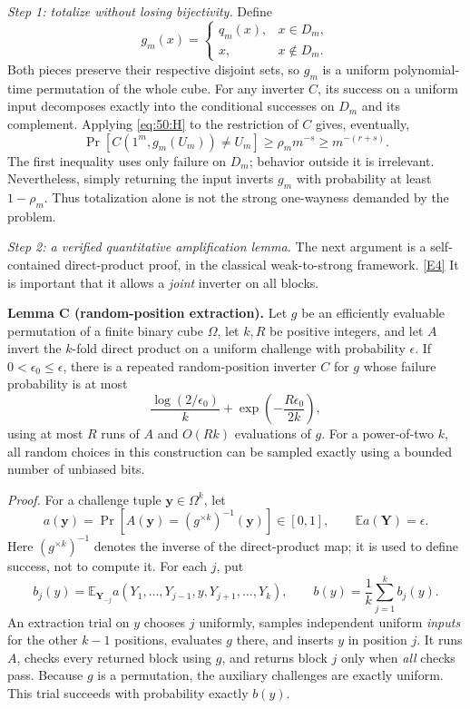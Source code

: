 \documentclass[11pt,a4paper]{article}
\newcommand{\E}{\mathbb{E}}
\newcommand{\eref}[2]{\hyperlink{extra:#1:#2}{[E#2]}}
\numberwithin{equation}{section}
\begin{document}
\textit{Step 1: totalize without losing bijectivity.}
Define
\begin{equation}\label{eq:50:guard}
 g_m(x)=\begin{cases}q_m(x),&x\in D_m,\\x,&x\notin D_m.\end{cases}
\end{equation}
Both pieces preserve their respective disjoint sets, so $g_m$ is a
uniform polynomial-time permutation of the whole cube. For any
inverter $C$, its success on a uniform input decomposes exactly into the
conditional successes on $D_m$ and its complement. Applying
\eqref{eq:50:H} to the restriction of $C$ gives, eventually,
\begin{equation}\label{eq:50:weak}
 \Pr[C(1^m,g_m(U_m))\ne U_m]
       \ge \rho_m m^{-s}\ge m^{-(r+s)}.
\end{equation}
The first inequality uses only failure on $D_m$; behavior outside it is
irrelevant. Nevertheless, simply returning the input inverts $g_m$ with
probability at least $1-\rho_m$. Thus totalization alone is not the
strong one-wayness demanded by the problem.

\textit{Step 2: a verified quantitative amplification lemma.}
The next argument is a self-contained direct-product proof, in the
classical weak-to-strong framework. \eref{50}{4}
It is important that it allows a \emph{joint} inverter on all blocks.

\textbf{Lemma C (random-position extraction).}
Let $g$ be an efficiently evaluable permutation of a finite binary cube
$\Omega$, let $k,R$ be positive integers, and let $A$ invert the
$k$-fold direct product on a uniform
challenge with probability $\epsilon$. If
$0<\epsilon_0\le\epsilon$, there is a repeated random-position inverter
$C$ for $g$ whose failure probability is at most
\begin{equation}\label{eq:50:extract}
 \frac{\log(2/\epsilon_0)}{k}
     +\exp\left(-\frac{R\epsilon_0}{2k}\right),
\end{equation}
using at most $R$ runs of $A$ and $O(Rk)$ evaluations of $g$.
For a power-of-two $k$, all random choices in this construction can be
sampled exactly using a bounded number of unbiased bits.

\textit{Proof.}
For a challenge tuple $\mathbf y\in\Omega^k$, let
\[
 a(\mathbf y)=\Pr[A(\mathbf y)=(g^{\times k})^{-1}(\mathbf y)]\in[0,1],
 \qquad \E a(\mathbf Y)=\epsilon.
\]
Here $(g^{\times k})^{-1}$ denotes the inverse of the direct-product map;
it is used to define success, not to compute it. For each $j$, put
\[
 b_j(y)=\E_{\mathbf Y_{-j}}a(Y_1,\ldots,Y_{j-1},y,Y_{j+1},\ldots,Y_k),
 \qquad b(y)=\frac1k\sum_{j=1}^k b_j(y).
\]
An extraction trial on $y$ chooses $j$ uniformly, samples independent
uniform \emph{inputs} for the other $k-1$ positions, evaluates $g$ there,
and inserts $y$ in position $j$. It runs $A$, checks every returned block
using $g$, and returns block $j$ only when \emph{all} checks pass.
Because $g$ is a permutation, the auxiliary challenges are exactly
uniform. This trial succeeds with probability exactly $b(y)$.
\end{document}
